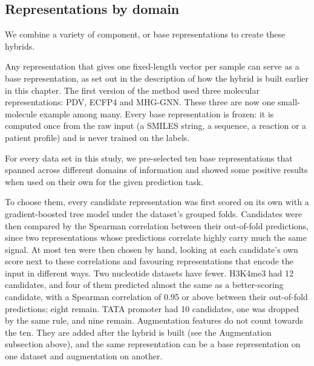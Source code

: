 \subsection{Representations by domain}

We combine a variety of component, or base representations to create these hybrids.

Any representation that gives one fixed-length vector per sample can serve as a base representation, as set out in the description of how the hybrid is built earlier in this chapter. The first version of the method used three molecular representations: PDV, ECFP4 and MHG-GNN. These three are now one small-molecule example among many. Every base representation is frozen: it is computed once from the raw input (a SMILES string, a sequence, a reaction or a patient profile) and is never trained on the labels.

For every data set in this study, we pre-selected ten base representations that spanned across different domains of information and showed some positive results when used on their own for the given prediction task.

To choose them, every candidate representation was first scored on its own with a gradient-boosted tree model \citep{ke2017lightgbm} under the dataset's grouped folds. Candidates were then compared by the Spearman correlation between their out-of-fold predictions, since two representations whose predictions correlate highly carry much the same signal. At most ten were then chosen by hand, looking at each candidate's own score next to these correlations and favouring representations that encode the input in different ways. Two nucleotide datasets have fewer. H3K4me3 had 12 candidates, and four of them predicted almost the same as a better-scoring candidate, with a Spearman correlation of 0.95 or above between their out-of-fold predictions; eight remain. TATA promoter had 10 candidates, one was dropped by the same rule, and nine remain. Augmentation features do not count towards the ten. They are added after the hybrid is built (see the Augmentation subsection above), and the same representation can be a base representation on one dataset and augmentation on another.

